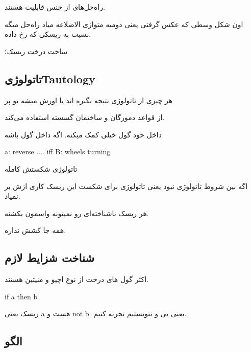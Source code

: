 راه‌حل‌های از جنس قابلیت هستند.

اون شکل وسطی که عکس گرفتی یعنی دومیه متوازی الاضلاعه میاد راه‌حل میگه نسبت به
ریسکی که رخ داده.

ساخت درخت ریسک؛

\subsection{تاتولوژیTautology}

هر چیزی از تاتولوژی نتیجه بگیره اند یا اورش میشه تو پر

از قواعد دمورگان و ساختمان گسسته استفاده می‌کند.

داخل خود گول خیلی کمک میکنه. اگه داخل گول باشه

a: reverse .... iff B: wheels turning

تاتولوژی شکستش کامله

اگه بین شروط تاتولوژی نبود یعنی تاتولوژی برای شکست این ریسک کاری ازش بر نمیاد.

هر ریسک ناشناخته‌ای رو نمیتونه واسمون بکشنه.

همه جا کشش نداره.

\subsection{شناخت شزایط لازم}

اکثر گول ‌های درخت از نوع اچیو و منیتین هستند.

if a then b

ریسک یعنی a هست و not b. یعنی بی و نتونستیم تجربه کنیم.

\subsection{الگو}


